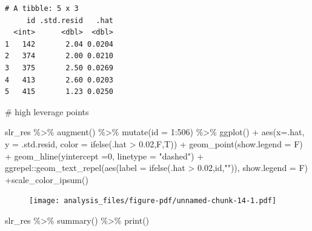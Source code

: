 \documentclass[
  letterpaper,
  DIV=11,
  numbers=noendperiod]{scrreprt}
\newenvironment{Shaded}{\begin{snugshade}}{\end{snugshade}}
\newcommand{\AttributeTok}[1]{\textcolor[rgb]{0.65,0.35,0.00}{#1}}
\newcommand{\CommentTok}[1]{\textcolor[rgb]{0.41,0.41,0.41}{#1}}
\newcommand{\DecValTok}[1]{\textcolor[rgb]{0.47,0.16,0.63}{#1}}
\newcommand{\FloatTok}[1]{\textcolor[rgb]{0.65,0.35,0.00}{#1}}
\newcommand{\FunctionTok}[1]{\textcolor[rgb]{0.02,0.16,0.49}{#1}}
\newcommand{\NormalTok}[1]{\textcolor[rgb]{0.33,0.33,0.33}{#1}}
\newcommand{\SpecialCharTok}[1]{\textcolor[rgb]{0.00,0.46,0.62}{#1}}
\newcommand{\StringTok}[1]{\textcolor[rgb]{0.00,0.50,0.00}{#1}}
\begin{document}
\begin{verbatim}
# A tibble: 5 x 3
     id .std.resid   .hat
  <int>      <dbl>  <dbl>
1   142       2.04 0.0204
2   374       2.00 0.0210
3   375       2.50 0.0269
4   413       2.60 0.0203
5   415       1.23 0.0250
\end{verbatim}

\begin{Shaded}
\begin{Highlighting}[]
\CommentTok{\# high leverage points}

\NormalTok{slr\_res }\SpecialCharTok{\%\textgreater{}\%} 
  \FunctionTok{augment}\NormalTok{() }\SpecialCharTok{\%\textgreater{}\%} \FunctionTok{mutate}\NormalTok{(}\AttributeTok{id =} \DecValTok{1}\SpecialCharTok{:}\DecValTok{506}\NormalTok{) }\SpecialCharTok{\%\textgreater{}\%} 
  \FunctionTok{ggplot}\NormalTok{() }\SpecialCharTok{+} \FunctionTok{aes}\NormalTok{(}\AttributeTok{x=}\NormalTok{.hat, }\AttributeTok{y =}\NormalTok{ .std.resid, }\AttributeTok{color =} \FunctionTok{ifelse}\NormalTok{(.hat }\SpecialCharTok{\textgreater{}} \FloatTok{0.02}\NormalTok{,F,T)) }\SpecialCharTok{+} \FunctionTok{geom\_point}\NormalTok{(}\AttributeTok{show.legend =}\NormalTok{ F) }\SpecialCharTok{+} \FunctionTok{geom\_hline}\NormalTok{(}\AttributeTok{yintercept =}\DecValTok{0}\NormalTok{, }\AttributeTok{linetype =} \StringTok{"dashed"}\NormalTok{) }\SpecialCharTok{+} 
\NormalTok{  ggrepel}\SpecialCharTok{::}\FunctionTok{geom\_text\_repel}\NormalTok{(}\FunctionTok{aes}\NormalTok{(}\AttributeTok{label =} \FunctionTok{ifelse}\NormalTok{(.hat }\SpecialCharTok{\textgreater{}} \FloatTok{0.02}\NormalTok{,id,}\StringTok{""}\NormalTok{)), }\AttributeTok{show.legend =}\NormalTok{ F) }\SpecialCharTok{+}\FunctionTok{scale\_color\_ipsum}\NormalTok{()}
\end{Highlighting}
\end{Shaded}

\begin{figure}[H]

{\centering \texttt{[image: analysis\_files/figure-pdf/unnamed-chunk-14-1.pdf]}

}

\end{figure}

\begin{Shaded}
\begin{Highlighting}[]
\NormalTok{slr\_res }\SpecialCharTok{\%\textgreater{}\%} \FunctionTok{summary}\NormalTok{() }\SpecialCharTok{\%\textgreater{}\%} \FunctionTok{print}\NormalTok{()}
\end{Highlighting}
\end{Shaded}
\end{document}

